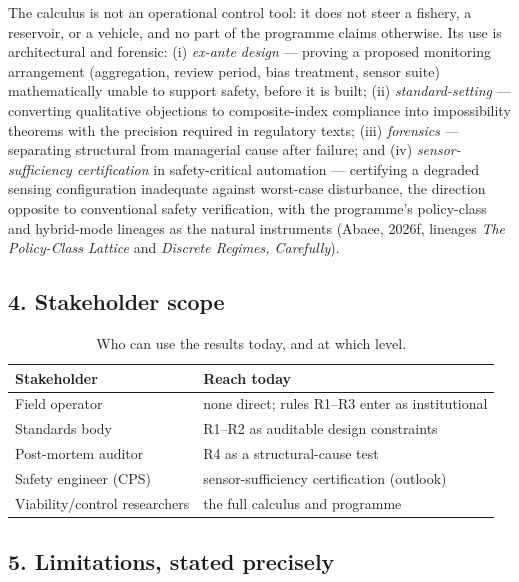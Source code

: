 \documentclass[10pt,twocolumn]{article}
\theoremstyle{definition}
\begin{document}
The calculus is not an operational control tool: it does not steer a
fishery, a reservoir, or a vehicle, and no part of the programme claims
otherwise. Its use is architectural and forensic: (i) \emph{ex-ante
design} --- proving a proposed monitoring arrangement (aggregation,
review period, bias treatment, sensor suite) mathematically unable to
support safety, before it is built; (ii) \emph{standard-setting} ---
converting qualitative objections to composite-index compliance into
impossibility theorems with the precision required in regulatory texts;
(iii) \emph{forensics} --- separating structural from managerial cause
after failure; and (iv) \emph{sensor-sufficiency certification} in
safety-critical automation --- certifying a degraded sensing configuration
inadequate against worst-case disturbance, the direction opposite to
conventional safety verification, with the programme's policy-class and
hybrid-mode lineages as the natural instruments (Abaee, 2026f, lineages \emph{The Policy-Class Lattice} and \emph{Discrete Regimes, Carefully}).

\subsection{4. Stakeholder scope}\label{stakeholders}

\begin{table}[t]
\centering
\footnotesize
\begin{tabular}{@{}l p{}@{}}
\toprule
Stakeholder & Reach today \\
\midrule
Field operator & none direct; rules R1--R3 enter as institutional \\
Standards body & R1--R2 as auditable design constraints \\
Post-mortem auditor & R4 as a structural-cause test \\
Safety engineer (CPS) & sensor-sufficiency certification (outlook) \\
Viability/control researchers & the full calculus and programme \\
\bottomrule
\end{tabular}
\caption{Who can use the results today, and at which level.}
\end{table}

\subsection{5. Limitations, stated precisely}\label{limits}
\end{document}
